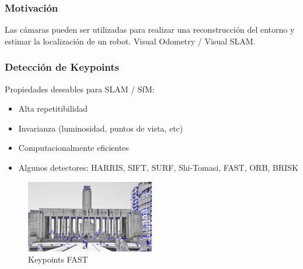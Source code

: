 \begin{frame}
    \frametitle{Motivación}
    
    Las cámaras pueden ser utilizadas para realizar una reconstrucción del entorno y estimar la localización de un robot. Visual Odometry / Visual SLAM.
    
    \begin{center}
    \end{center}
    
\end{frame}


\begin{frame}
    \frametitle{Detección de Keypoints}
    
    
    
    \footnotesize
    Propiedades deseables para SLAM / SfM:
    \begin{itemize}
        \item Alta repetitibilidad
        \item Invarianza (luminosidad, puntos de vista, etc)
        \item Computacionalmente eficientes
        \item Algunos detectores: HARRIS, SIFT, SURF, Shi-Tomasi, FAST, ORB, BRISK
    \end{itemize}

    
    \begin{figure}
        \includegraphics[width=0.5\textwidth]{./images/keypoints_fast}
        \caption{Keypoints FAST}
    \end{figure}

\end{frame}



